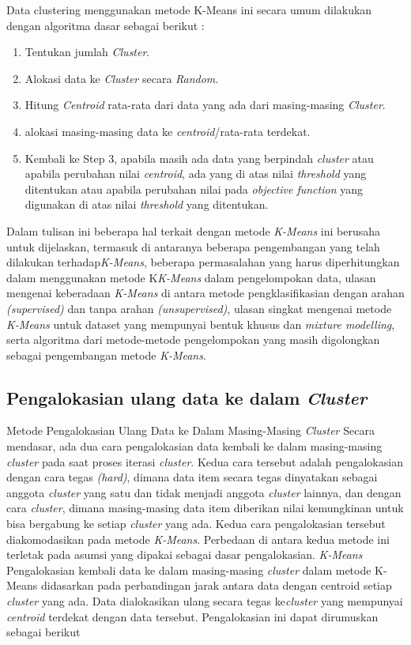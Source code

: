 \par Data clustering menggunakan metode K-Means ini secara umum dilakukan dengan algoritma dasar sebagai berikut :

\begin{enumerate}
    \item Tentukan jumlah \textit{Cluster}.
    \item Alokasi data ke \textit{Cluster} secara \textit{Random}.
    \item Hitung \textit{Centroid} rata-rata dari data yang ada dari masing-masing \textit{Cluster}.
    \item alokasi masing-masing data ke \textit{centroid}/rata-rata terdekat.
    \item Kembali ke Step 3, apabila masih ada data yang berpindah \textit{cluster} atau apabila perubahan nilai \textit{centroid}, ada yang di atas nilai \textit{threshold} yang ditentukan atau apabila perubahan nilai pada \textit{objective function} yang digunakan di atas nilai \textit{threshold}  yang ditentukan.
\end{enumerate}
\par Dalam tulisan ini beberapa hal terkait dengan metode \textit{K-Means} ini berusaha untuk dijelaskan, termasuk di antaranya beberapa pengembangan yang telah dilakukan terhadap\textit{K-Means}, beberapa permasalahan yang harus diperhitungkan dalam menggunakan metode K\textit{K-Means} dalam pengelompokan data, ulasan mengenai keberadaan \textit{K-Means} di antara metode pengklasifikasian dengan arahan \textit{(supervised)} dan tanpa arahan \textit{(unsupervised)}, ulasan singkat mengenai metode \textit{K-Means} untuk dataset yang mempunyai bentuk khusus dan \textit{mixture modelling}, serta algoritma dari metode-metode pengelompokan yang masih digolongkan sebagai pengembangan metode \textit{K-Means}.

\subsection{Pengalokasian ulang data ke dalam \textit{Cluster}}
\par Metode Pengalokasian Ulang Data ke Dalam Masing-Masing \textit{Cluster} Secara mendasar, ada dua cara pengalokasian data kembali ke dalam masing-masing \textit{cluster} pada saat proses iterasi \textit{cluster}. Kedua cara tersebut adalah pengalokasian dengan cara tegas \textit{(hard)}, dimana data item secara tegas dinyatakan sebagai anggota \textit{cluster} yang satu dan tidak menjadi anggota \textit{cluster}  lainnya, dan dengan cara \textit{cluster}, dimana masing-masing data item diberikan nilai kemungkinan untuk bisa bergabung ke setiap \textit{cluster} yang ada. Kedua cara pengalokasian tersebut diakomodasikan pada metode \textit{K-Means}. Perbedaan di antara kedua metode ini terletak pada asumsi yang dipakai sebagai dasar pengalokasian. \textit{K-Means } Pengalokasian kembali data ke dalam masing-masing \textit{cluster} dalam metode  K-Means didasarkan pada perbandingan jarak antara data dengan centroid setiap \textit{cluster}  yang ada. Data dialokasikan ulang secara tegas ke\textit{cluster} yang mempunyai \textit{centroid} terdekat dengan data tersebut. Pengalokasian ini dapat dirumuskan sebagai berikut \cite{pane2018qualitative}

